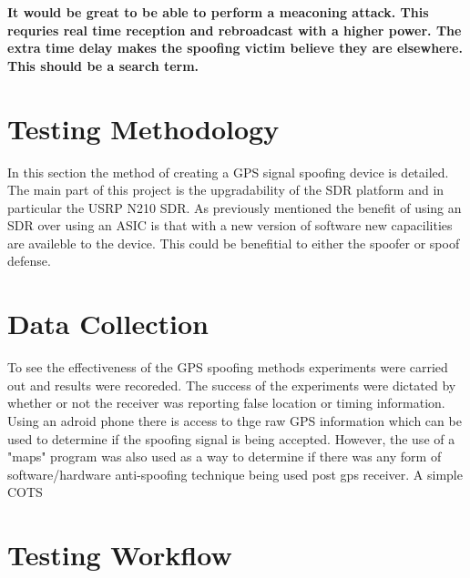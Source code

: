 \textbf{It would be great to be able to perform a meaconing attack. This requries real time reception and rebroadcast with a higher power. The extra time delay
makes the spoofing victim believe they are elsewhere. This should be a search term.}


\section{Testing Methodology}

In this section the method of creating a GPS signal spoofing device is detailed. The main part of this project is the upgradability of the SDR platform
and in particular the USRP N210 SDR. As previously mentioned the benefit of using an SDR over using an ASIC is that with a new version of software 
new capacilities are availeble to the device. This could be benefitial to either the spoofer or spoof defense. 

\section{Data Collection}

To see the effectiveness of the GPS spoofing methods experiments were carried out and results were recoreded. The success of the experiments were dictated by whether or
not the receiver was reporting false location or timing information. Using an adroid phone there is access to thge raw GPS information which can be used to determine if
the spoofing signal is being accepted. However, the use of a "maps" program was also used as a way to determine if there was any form of software/hardware anti-spoofing
technique being used post gps receiver. A simple COTS 

\section{Testing Workflow}

